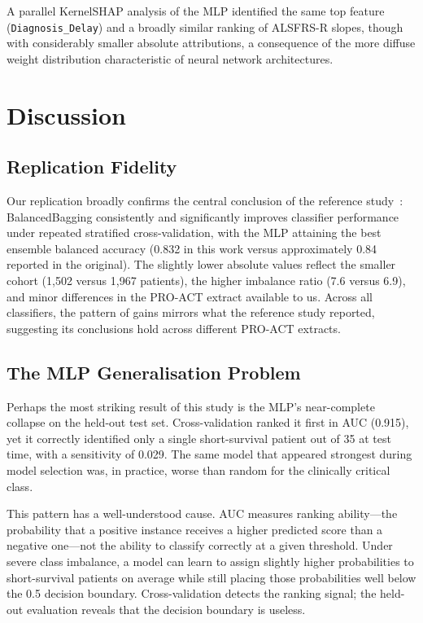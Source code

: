 \documentclass[a4paper,twoside]{article}
\begin{document}
A parallel KernelSHAP analysis of the MLP identified the same top feature
(\texttt{Diagnosis\_Delay}) and a broadly similar ranking of ALSFRS-R slopes,
though with considerably smaller absolute attributions, a consequence of the
more diffuse weight distribution characteristic of neural network architectures.


\section{Discussion}
\label{sec:discussion}

\subsection{Replication Fidelity}

Our replication broadly confirms the central conclusion of the reference
study~\cite{Papaiz2024}: BalancedBagging consistently and significantly improves
classifier performance under repeated stratified cross-validation, with the MLP
attaining the best ensemble balanced accuracy (0.832 in this work versus
approximately 0.84 reported in the original). The slightly lower absolute values reflect the smaller cohort (1,502 versus
1,967 patients), the higher imbalance ratio (7.6 versus 6.9), and minor
differences in the PRO-ACT extract available to us. Across all classifiers,
the pattern of gains mirrors what the reference study reported, suggesting its
conclusions hold across different PRO-ACT extracts.

\subsection{The MLP Generalisation Problem}

Perhaps the most striking result of this study is the MLP's near-complete
collapse on the held-out test set. Cross-validation ranked it first in AUC
(0.915), yet it correctly identified only a single short-survival patient
out of 35 at test time, with a sensitivity of 0.029. The same model that appeared
strongest during model selection was, in practice, worse than random for the
clinically critical class.

This pattern has a well-understood cause. AUC measures ranking ability---the
probability that a positive instance receives a higher predicted score than a
negative one---not the ability to classify correctly at a given threshold. Under
severe class imbalance, a model can learn to assign slightly higher probabilities
to short-survival patients on average while still placing those probabilities well
below the 0.5 decision boundary. Cross-validation detects the ranking signal;
the held-out evaluation reveals that the decision boundary is useless.
\end{document}
